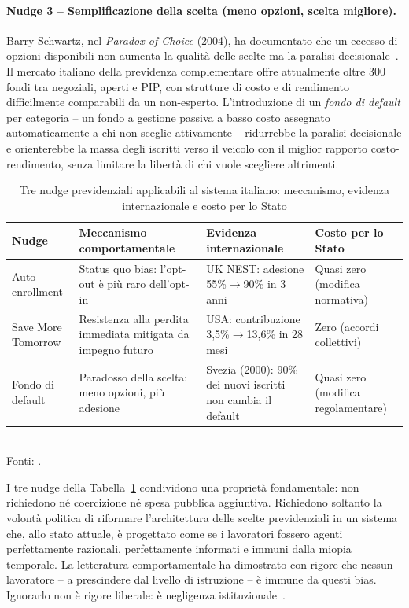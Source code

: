 \paragraph{Nudge 3 -- Semplificazione della scelta (meno opzioni,
  scelta migliore).}
Barry Schwartz, nel \emph{Paradox of Choice} (2004), ha documentato che
un eccesso di opzioni disponibili non aumenta la qualità delle scelte
ma la paralisi decisionale~\cite{Schwartz2004}. Il mercato italiano della
previdenza complementare offre attualmente oltre 300 fondi tra negoziali,
aperti e PIP, con strutture di costo e di rendimento difficilmente
comparabili da un non-esperto. L'introduzione di un \emph{fondo di
default} per categoria -- un fondo a gestione passiva a basso costo
assegnato automaticamente a chi non sceglie attivamente -- ridurrebbe
la paralisi decisionale e orienterebbe la massa degli iscritti verso
il veicolo con il miglior rapporto costo-rendimento, senza limitare
la libertà di chi vuole scegliere altrimenti.

\begin{table}[htbp]
\centering
\caption{Tre nudge previdenziali applicabili al sistema italiano:
         meccanismo, evidenza internazionale e costo per lo Stato}
\label{tab:nudge}
\begin{tabular}{p{3.5cm}p{4.0cm}p{3.5cm}p{2.5cm}}
\toprule
\textbf{Nudge} & \textbf{Meccanismo comportamentale} &
  \textbf{Evidenza internazionale} & \textbf{Costo per lo Stato} \\
\midrule
Auto-enrollment &
  Status quo bias: l'opt-out è più raro dell'opt-in &
  UK NEST: adesione 55\%$\to$90\% in 3 anni~\cite{DWP2017} &
  Quasi zero (modifica normativa) \\
Save More Tomorrow &
  Resistenza alla perdita immediata mitigata da impegno futuro &
  USA: contribuzione 3,5\%$\to$13,6\% in 28 mesi~\cite{ThalerBenartzi2004} &
  Zero (accordi collettivi) \\
Fondo di default &
  Paradosso della scelta: meno opzioni, più adesione &
  Svezia (2000): 90\% dei nuovi iscritti non cambia il default~\cite{Sundén2006} &
  Quasi zero (modifica regolamentare) \\
\bottomrule
\end{tabular}
\smallskip\\
\footnotesize
Fonti: \cite{ThalerSunstein2008, ThalerBenartzi2004, DWP2017, Sundén2006}.
\end{table}

I tre nudge della Tabella~\ref{tab:nudge} condividono una proprietà
fondamentale: non richiedono né coercizione né spesa pubblica aggiuntiva.
Richiedono soltanto la volontà politica di riformare l'architettura delle
scelte previdenziali in un sistema che, allo stato attuale, è progettato
come se i lavoratori fossero agenti perfettamente razionali, perfettamente
informati e immuni dalla miopia temporale. La letteratura comportamentale
ha dimostrato con rigore che nessun lavoratore -- a prescindere dal livello
di istruzione -- è immune da questi bias. Ignorarlo non è rigore liberale:
è negligenza istituzionale~\cite{ThalerSunstein2008, Bosi2018}.